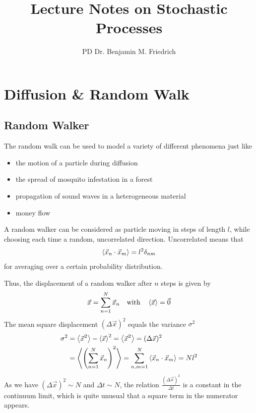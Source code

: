\documentclass{/home/ben/Templates/notebook}
\title{\color{bluebase} Lecture Notes on Stochastic Processes}
\author{PD Dr. Benjamin M. Friedrich}
\begin{document}
	
	\frontmatter
	
	\maketitle
	
	\tableofcontents
	
	\mainmatter
	
	\chapter{Diffusion \& Random Walk}
	
	\section{Random Walker}
	
	The random walk can be used to model a variety of different phenomena just like
	\begin{itemize}
		\item{the motion of a particle during diffusion}
		\item{the spread of mosquito infestation in a forest}
		\item{propagation of sound waves in a heterogeneous material}
		\item{money flow}
	\end{itemize}
	
	\begin{mdframed}[style=default, frametitle={Model: Random Walker}]
		A random walker can be considered as particle moving in steps of length $l$, while choosing each time a random, uncorrelated direction. Uncorrelated means that
		\begin{equation}
		\expval{\vec{x}_n \cdot \vec{x}_m} = l^2 \delta_{nm}
		\end{equation}
		for averaging over a certain probability distribution.
	\end{mdframed}
	
	Thus, the displacement of a random walker after $n$ steps is given by
	\begin{equation}
	\vec{x} = \sum^N_{n = 1}{\vec{x}_n} \quad \mathrm{with} \quad \expval{\vec{x}} = \vec{0}
	\end{equation}
	The mean square displacement $(\Delta \vec{x})^2$ equals the variance $\sigma^2$
	\begin{align*}
		\sigma^2 &= \expval{\vec{x}^2} - \expval{\vec{x}}^2 = \expval{\vec{x}^2} = (\Delta \vec{x})^2 \\ 
		&= \expval{\left( \sum^N_{n = 1}{\vec{x}_n} \right)^2} = \sum^N_{n, m = 1}\expval{\vec{x}_n \cdot \vec{x}_m} = N l^2
	\end{align*}
	As we have $(\Delta \vec{x})^2 \sim N$ and $\Delta t \sim N $, the relation $ \frac{(\Delta \vec{x})^2}{\Delta t} $
	is a constant in the continuum limit, which is quite unusual that a square term in the numerator appears.  
	
\end{document}
